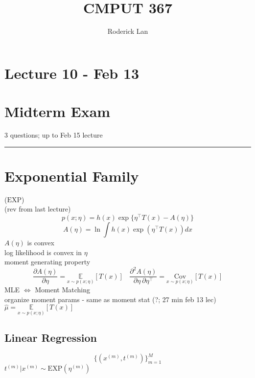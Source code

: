 \documentclass{article}
\title{CMPUT 367}
\author{Roderick Lan}
\date{}
\begin{document}
\maketitle

\tableofcontents
\break

\section*{Lecture 10 - Feb 13}
\section{Midterm Exam}
3 questions; up to Feb 15 lecture
\\
\noindent\rule{\textwidth}{0.5pt}

\section{Exponential Family}
($\mathrm{EXP}$)\\
(rev from last lecture)
\[
    p(x;\eta) = h(x) \exp \{ \eta ^\top T(x) - A(\eta) \}
\]
\[
    A(\eta) = \ln \int h(x)\exp (\eta ^\top T(x))dx
\]
$A(\eta)$ is convex
\\
log likelihood is convex in $\eta$
\\
moment generating property
\[
    \frac{\partial A(\eta)}{\partial \eta} = \underset{x\sim p(x; \eta)}{\mathbb E}[T(x)]
    \ \ \ \ 
    \frac{\partial^2 A(\eta)}{\partial \eta \ \partial \eta^\top}=
    \underset{x \sim p(x; \eta)}{\mathrm{Cov}}[T(x)]
\]
\noindent
MLE $\iff$ Moment Matching \\
organize moment params - same as moment stat (?; 27 min feb 13 lec)\\
$\hat \mu= \underset{x\sim p(x; \eta)}{\mathbb E}[T(x)]$

\subsection{Linear Regression}
\[
    \{(x^{(m)}, t^{(m)}) \} _{m=1}^M
\]
$t^{(m)} | x^{(m)} \sim \mathrm{EXP} (\eta^{(m)})$






\end{document}
